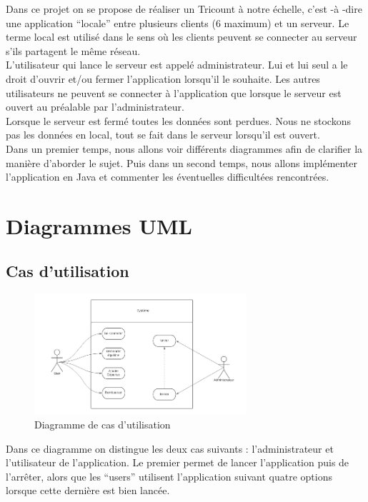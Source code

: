 \documentclass[12,french]{report}
\begin{document}
Dans ce projet on se propose de réaliser un Tricount à notre échelle, c'est -à -dire une application “locale” entre plusieurs clients (6 maximum) et un serveur. Le terme local est utilisé dans le sens où les clients peuvent se connecter au serveur s'ils partagent le même réseau.\\

L’utilisateur qui lance le serveur est appelé administrateur. Lui et lui seul a le droit d’ouvrir et/ou fermer l’application lorsqu’il le souhaite. Les autres utilisateurs ne peuvent se connecter à l’application que lorsque le serveur est ouvert au préalable par l’administrateur. \\

Lorsque le serveur est fermé toutes les données sont perdues. Nous ne stockons pas les données en local, tout se fait dans le serveur lorsqu’il est ouvert.\\

Dans un premier temps, nous allons voir différents diagrammes afin de clarifier la manière d’aborder le sujet. Puis dans un second temps, nous allons implémenter l’application en Java et commenter les éventuelles difficultées rencontrées.

\chapter{Diagrammes UML}

\section{Cas d'utilisation}

\begin{figure}[H]
	\center
	\includegraphics[width=0.7\textwidth]{./Images/Use-Case}
	\caption{Diagramme de cas d'utilisation}
\end{figure}\vspace{0.2cm}

Dans ce diagramme on distingue les deux cas suivants : l’administrateur et l’utilisateur de l’application. Le premier permet de lancer l’application puis de l'arrêter, alors que les “users” utilisent l’application suivant quatre options lorsque cette dernière est bien lancée.
\end{document}

